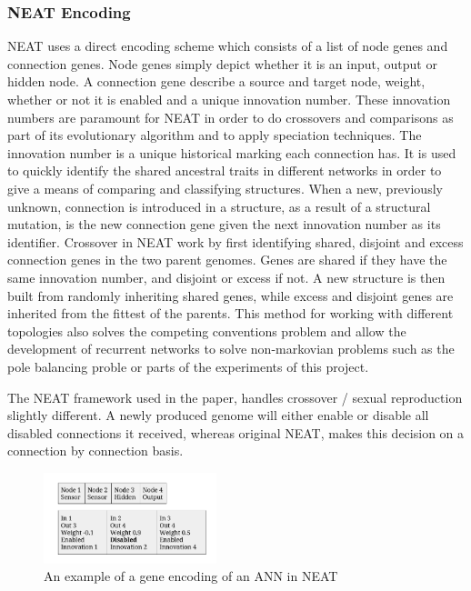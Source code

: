 \subsubsection{NEAT Encoding}
NEAT uses a direct encoding scheme which consists of a list of node genes and connection genes. Node genes simply depict whether it is an input, output or hidden node. A connection gene describe a source and target node, weight, whether or not it is enabled and a unique innovation number.
These innovation numbers are paramount for NEAT in order to do crossovers and comparisons as part of its evolutionary algorithm and to apply speciation techniques. The innovation number is a unique historical marking each connection has. It is used to quickly identify the shared ancestral traits in different networks in order to give a means of comparing and classifying structures. When a new, previously unknown, connection is introduced in a structure, as a result of a structural mutation, is the new connection gene given the next innovation number as its identifier.
Crossover in NEAT work by first identifying shared, disjoint and excess connection genes in the two parent genomes. Genes are shared if they have the same innovation number, and disjoint or excess if not. A new structure is then built from randomly inheriting shared genes, while excess and disjoint genes are inherited from the fittest of the parents. This method for working with different topologies also solves the competing conventions problem and allow the development of recurrent networks to solve non-markovian problems such as the pole balancing proble or parts of the experiments of this project.

The NEAT framework used in the paper, handles crossover / sexual reproduction slightly different. A newly produced genome will either enable or disable all disabled connections it received, whereas original NEAT, makes this decision on a connection by connection basis.

\begin{figure}[H]
	\centering
	\includegraphics[width=190px]{img/genotype.png}
	\caption[NEAT gene encoding]{An example of a gene encoding of an ANN in NEAT}
	\label{fig:genotype}
\end{figure}

